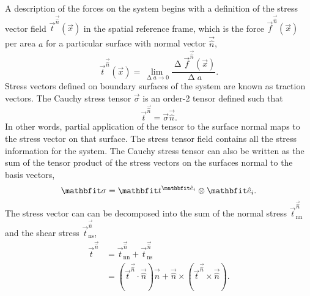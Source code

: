 A description of the forces on the system begins with a definition of the stress vector field $\vec{t}^{\vec{\hat{n}}}(\vec{x})$ in the spatial reference frame, which is the force $\vec{f}^{\vec{\hat{n}}}(\vec{x})$ per area $a$ for a particular surface with normal vector $\vec{\hat{n}}$,
\begin{equation}
    \vec{t}^{\vec{\hat{n}}}(\vec{x}) = \lim_{\upDelta a \to 0} \frac{\upDelta \vec{f}^{\vec{\hat{n}}}(\vec{x})}{\upDelta a}.
\end{equation}
Stress vectors defined on boundary surfaces of the system are known as traction vectors.
The Cauchy stress tensor $\vec{\sigma}$ is an order-2 tensor defined such that
\begin{equation}
    \vec{t}^{\vec{\hat{n}}} = \vec{\sigma} \vec{\hat{n}}.
\end{equation}
In other words, partial application of the tensor to the surface normal maps to the stress vector on that surface.
The stress tensor field contains all the stress information for the system.
The Cauchy stress tensor can also be written as the sum of the tensor product of the stress vectors on the surfaces normal to the basis vectors,
\begin{equation}
    \vec{\sigma} = \vec{t}^{\unitvec_{i}} \otimes \unitvec_{i}.
\end{equation}
The stress vector can can be decomposed into the sum of the normal stress $\vec{t}^{\vec{\hat{n}}}_{\textrm{nn}}$ and the shear stress $\vec{t}^{\vec{\hat{n}}}_{\textrm{ns}}$,
\begin{align}
    \vec{t}^{\vec{\hat{n}}} &= \vec{t}^{\vec{\hat{n}}}_{\textrm{nn}} + \vec{t}^{\vec{\hat{n}}}_{\textrm{ns}} \nonumber\\
                            &= (\vec{t}^{\vec{\hat{n}}} \cdot \vec{\hat{n}} ) \vec{\hat{n}} +  \vec{\hat{n}} \times (\vec{t}^{\vec{\hat{n}}} \times \vec{\hat{n}}).
\end{align}

